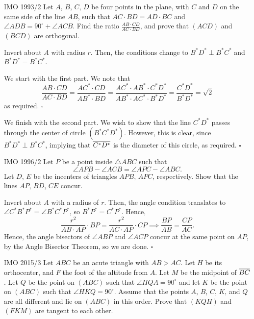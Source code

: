 \documentclass{article}
\begin{document}
\begin{problem}[8.34]{IMO 1993/2}
Let $A$, $B$, $C$, $D$ be four points in the plane, with $C$ and $D$ on the same side of the line $AB$, such that $AC \cdot BD = AD \cdot BC$ and $\angle ADB = 90^\circ + \angle ACB$. Find the ratio $\tfrac{AB\cdot CD}{AC \cdot BD}$, and prove that $(ACD)$ and $(BCD)$ are orthogonal.
\end{problem}

Invert about $A$ with radius $r$. Then, the conditions change to $B^*D^*\perp B^*C^*$ and $B^*D^* = B^*C^*$.

We start with the first part. We note that \[\dfrac{AB\cdot CD}{AC \cdot BD} = \dfrac{AC^* \cdot CD}{AB^* \cdot BD} = \dfrac{AC^* \cdot AB^* \cdot C^*D^*}{AB^* \cdot AC^*\cdot B^*D^*} = \dfrac{C^*D^*}{B^*D^*} = \sqrt{2}\] as required. $\square$

We finish with the second part. We wish to show that the line $C^*D^*$ passes through the center of circle $(B^*C^*D^*)$. However, this is clear, since $B^*D^*\perp B^*C^*$, implying that $\overline{C^*D^*}$ is the diameter of this circle, as required. $\square$

\begin{problem}[8.35]{IMO 1996/2}
Let $P$ be a point inside $\triangle ABC$ such that \[\angle APB - \angle ACB = \angle APC - \angle ABC.\] Let $D$, $E$ be the incenters of triangles $APB$, $APC$, respectively. Show that the lines $AP$, $BD$, $CE$ concur.
\end{problem}

Invert about $A$ with a radius of $r$. Then, the angle condition translates to $\angle C^*B^*P^* = \angle B^*C^*P^*$, so $B^*P^* = C^*P^*$. Hence, \[\dfrac{r^2}{AB \cdot AP}\cdot BP = \dfrac{r^2}{AC \cdot AP}\cdot CP \implies \dfrac{BP}{AB} = \dfrac{CP}{AC}.\] Hence, the angle bisectors of $\angle ABP$ and $\angle ACP$ concur at the same point on $AP$, by the Angle Bisector Theorem, so we are done. $\square$

\begin{problem}[8.36]{IMO 2015/3}
Let $ABC$ be an acute triangle with $AB > AC$. Let $H$ be its orthocenter, and $F$ the foot of the altitude from $A$. Let $M$ be the midpoint of $\overline{BC}$. Let $Q$ be the point on $(ABC)$ such that $\angle HQA = 90^\circ$ and let $K$ be the point on $(ABC)$ such that $\angle HKQ = 90^\circ$. Assume that the points $A$, $B$, $C$, $K$, and $Q$ are all different and lie on $(ABC)$ in this order. Prove that $(KQH)$ and $(FKM)$ are tangent to each other.
\end{problem}
\end{document}
